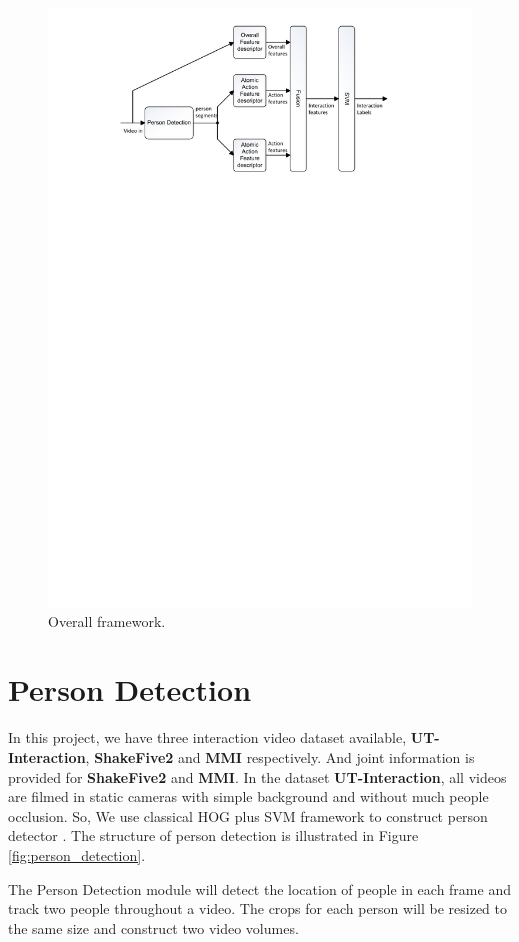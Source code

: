  
 \begin{figure}
 	\includegraphics[trim=2cm 21.5cm 0cm 1cm]{fig01/architecture.pdf}
 	\caption{Overall framework. }
 	\label{fig:overall_arch}
 \end{figure}

\section{Person Detection}
\label{3_2}
In this project, we have three interaction video dataset available, \textbf{UT-Interaction}, \textbf{ShakeFive2} and \textbf{MMI} respectively. And joint information is provided for \textbf{ShakeFive2} and \textbf{MMI}. In the dataset \textbf{UT-Interaction}, all videos are filmed in static cameras with simple background and without much people occlusion. So, We use classical HOG plus SVM framework to construct person detector \cite{inria_person}. The structure of person detection is illustrated in Figure \ref{fig:person_detection}.  
\par 
The Person Detection module will detect the location of people in each frame and track two people throughout a video. The crops for each person will be resized to the same size and construct two video volumes.  
        
